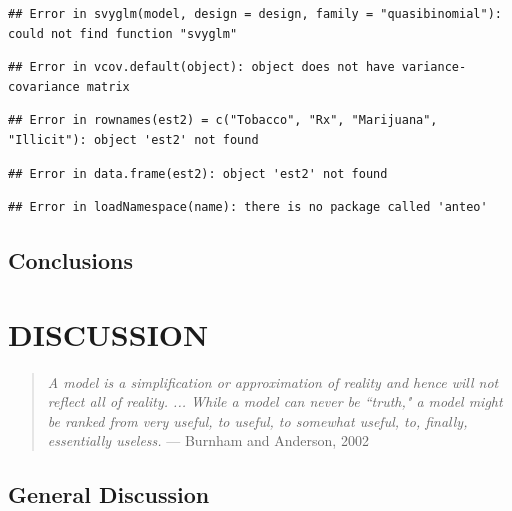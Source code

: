 \documentclass[]{DissertateUSU}
\begin{document}
\begin{verbatim}
## Error in svyglm(model, design = design, family = "quasibinomial"): could not find function "svyglm"
\end{verbatim}

\begin{verbatim}
## Error in vcov.default(object): object does not have variance-covariance matrix
\end{verbatim}

\begin{verbatim}
## Error in rownames(est2) = c("Tobacco", "Rx", "Marijuana", "Illicit"): object 'est2' not found
\end{verbatim}

\begin{verbatim}
## Error in data.frame(est2): object 'est2' not found
\end{verbatim}

\begin{verbatim}
## Error in loadNamespace(name): there is no package called 'anteo'
\end{verbatim}

\section{Conclusions}\label{conclusions}

\singlespacing

\FloatBarrier

\newpage

 \fancyhead[R]{\thepage} \fancyfoot[C]{}

\chapter{DISCUSSION}

\begin{quote}
\emph{A model is a simplification or approximation of reality and hence will not reflect all of reality. ... While a model can never be ``truth," a model might be ranked from very useful, to useful, to somewhat useful, to, finally, essentially useless.}
--- Burnham and Anderson, 2002
\end{quote}

\doublespacing

\section{General Discussion}\label{general-discussion}
\end{document}
